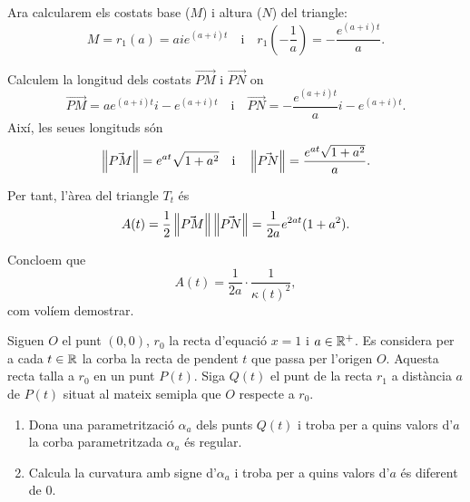 \documentclass[a4paper, 11pt]{article}
\begin{document}
\begin{solution}
    Ara calcularem els costats base ($M$) i altura ($N$) del triangle:
    \[
      M = r_1(a) = ai e^{(a + i)t} \quad \text{i} \quad
      r_1(-\frac{1}{a}) = -\frac{e^{(a + i)t}}{a}.
    \]

    Calculem la longitud dels costats $\vec{PM}$ i $\vec{PN}$ on
    \[
      \vec{PM} = ae^{(a + i)t}i - e^{(a + i)t}
      \quad \text{i} \quad
      \vec{PN} = -\frac{e^{(a + i)t}}{a}i - e^{(a + i)t}.
    \]
    Així, les seues longituds són
    \[
      \left\lVert\vec{PM}\right\rVert = e^{at} \sqrt{1 + a^2}
      \quad \text{i} \quad
      \left\lVert\vec{PN}\right\rVert = \frac{e^{at} \sqrt{1 + a^2}}{a}.
    \]
    
    Per tant, l'àrea del triangle $T_t$ és
    \[
      A(t) = \frac{1}{2} \left\lVert\vec{PM}\right\rVert \left\lVert\vec{PN}\right\rVert
      = \frac{1}{2a} e^{2at} (1 + a^2).
    \]

    Concloem que
    \[
      A(t) = \frac{1}{2a} \cdot \frac{1}{\kappa(t)^2},
    \]
    com volíem demostrar.
  \end{solution}

  \begin{exercise}
    Siguen $O$ el punt $(0, 0)$, $r_0$ la recta d'equació $x=1$ i $a \in
    \mathbb{R}^+$. Es considera per a cada $t \in \mathbb{R}$ la corba la recta de
    pendent $t$ que passa per l'origen $O$. Aquesta recta talla a $r_0$ en
    un punt $P(t)$. Siga $Q(t)$ el punt de la recta $r_1$ a distància $a$
    de $P(t)$ situat al mateix semipla que $O$ respecte a $r_0$.

    \begin{enumerate}[label=(\alph*)]
      \item Dona una parametrització $\alpha_a$ dels punts $Q(t)$ i troba
      per a quins valors d'$a$ la corba parametritzada $\alpha_a$ és
      regular.
      \item Calcula la curvatura amb signe d'$\alpha_a$ i troba per a quins
      valors d'$a$ és diferent de $0$.
    \end{enumerate}
  \end{exercise}

  \begin{solution}
    
  \end{solution}
\end{document}
